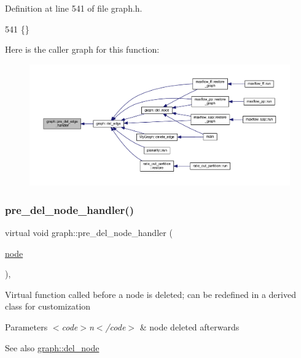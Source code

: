 Definition at line 541 of file graph.\+h.


\begin{DoxyCode}
541 \{\}           
\end{DoxyCode}
Here is the caller graph for this function\+:
\nopagebreak
\begin{figure}[H]
\begin{center}
\leavevmode
\includegraphics[width=350pt]{classgraph_a2cd0986dc5bcbfdbf0635c39e610784b_icgraph}
\end{center}
\end{figure}
\mbox{\label{classgraph_a64699c6cb14cdedab5e13232a8f3e754}} 
\subsubsection{\texorpdfstring{pre\+\_\+del\+\_\+node\+\_\+handler()}{pre\_del\_node\_handler()}}
{\footnotesize\ttfamily virtual void graph\+::pre\+\_\+del\+\_\+node\+\_\+handler (\begin{DoxyParamCaption}\item[{\mbox{\hyperlink{classnode}{node}}}]{ }\end{DoxyParamCaption})\hspace{0.3cm}{\ttfamily [inline]}, {\ttfamily [virtual]}}

Virtual function called before a node is deleted; can be redefined in a derived class for customization


\begin{DoxyParams}{Parameters}
{\em $<$code$>$n$<$/code$>$} & node deleted afterwards \\
\hline
\end{DoxyParams}
\begin{DoxySeeAlso}{See also}
\mbox{\hyperlink{classgraph_a8bdc09d5b9ac4bd26586b054d8fcbe91}{graph\+::del\+\_\+node}} 
\end{DoxySeeAlso}


